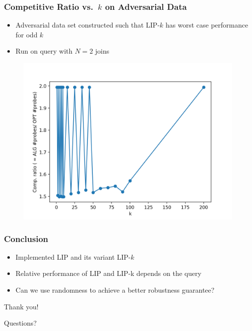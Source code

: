 \documentclass{beamer}
\begin{document}
\begin{frame}

  \frametitle{Competitive Ratio vs.\ $k$ on Adversarial Data}
  \begin{itemize}
      \item Adversarial data set constructed such that LIP-$k$ has worst case performance for odd $k$
      \item Run on query with $N = 2$ joins
  \end{itemize}
  \begin{figure}
    \centering
    \includegraphics[height=0.7\textheight,keepaspectratio]{cr-k-skewed}
  \end{figure}
\end{frame}



\begin{frame}
\frametitle{Conclusion}

  \begin{itemize}
    \item Implemented LIP and its variant LIP-$k$
    \item Relative performance of LIP and LIP-k depends on the query 
    \item Can we use randomness to achieve a better robustness guarantee?
  \end{itemize}
\end{frame}


\begin{frame}
\Huge{Thank you!}
\end{frame}

\begin{frame}
\Huge{Questions?}
\end{frame}
\end{document}

